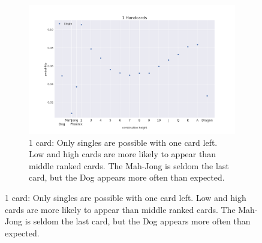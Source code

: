 \begin{figure}[hb]
    \begin{center}
        \begin{subfigure}[h]{.8\textwidth}\includegraphics[width=\textwidth]{images/det/type_for_len_1}
            \caption{1 card: Only singles are possible with one card left. Low and high cards are more likely to appear than middle ranked cards. The Mah-Jong is seldom the last card, but the Dog appears more often than expected.}
            \label{fig:hc1}
        \end{subfigure}


\end{center}
\end{figure}
